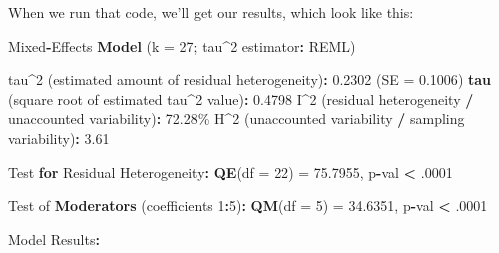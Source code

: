 \documentclass[
]{book}
\newenvironment{Shaded}{\begin{snugshade}}{\end{snugshade}}
\newcommand{\AttributeTok}[1]{\textcolor[rgb]{0.13,0.29,0.53}{#1}}
\newcommand{\ControlFlowTok}[1]{\textcolor[rgb]{0.13,0.29,0.53}{\textbf{#1}}}
\newcommand{\DecValTok}[1]{\textcolor[rgb]{0.00,0.00,0.81}{#1}}
\newcommand{\FloatTok}[1]{\textcolor[rgb]{0.00,0.00,0.81}{#1}}
\newcommand{\FunctionTok}[1]{\textcolor[rgb]{0.13,0.29,0.53}{\textbf{#1}}}
\newcommand{\NormalTok}[1]{#1}
\newcommand{\OtherTok}[1]{\textcolor[rgb]{0.56,0.35,0.01}{#1}}
\newcommand{\SpecialCharTok}[1]{\textcolor[rgb]{0.81,0.36,0.00}{\textbf{#1}}}
\begin{document}
When we run that code, we'll get our results, which look like this:

\begin{Shaded}
\begin{Highlighting}[]
\NormalTok{Mixed}\SpecialCharTok{{-}}\NormalTok{Effects }\FunctionTok{Model}\NormalTok{ (}\AttributeTok{k =} \DecValTok{27}\NormalTok{; tau}\SpecialCharTok{\^{}}\DecValTok{2}\NormalTok{ estimator}\SpecialCharTok{:}\NormalTok{ REML)}

\NormalTok{tau}\SpecialCharTok{\^{}}\DecValTok{2}\NormalTok{ (estimated amount of residual heterogeneity)}\SpecialCharTok{:}     \FloatTok{0.2302}\NormalTok{ (}\AttributeTok{SE =} \FloatTok{0.1006}\NormalTok{)}
\FunctionTok{tau}\NormalTok{ (square root of estimated tau}\SpecialCharTok{\^{}}\DecValTok{2}\NormalTok{ value)}\SpecialCharTok{:}             \FloatTok{0.4798}
\NormalTok{I}\SpecialCharTok{\^{}}\DecValTok{2}\NormalTok{ (residual heterogeneity }\SpecialCharTok{/}\NormalTok{ unaccounted variability)}\SpecialCharTok{:} \FloatTok{72.28}\NormalTok{\%}
\NormalTok{H}\SpecialCharTok{\^{}}\DecValTok{2}\NormalTok{ (unaccounted variability }\SpecialCharTok{/}\NormalTok{ sampling variability)}\SpecialCharTok{:}   \FloatTok{3.61}

\NormalTok{Test }\ControlFlowTok{for}\NormalTok{ Residual Heterogeneity}\SpecialCharTok{:}
\FunctionTok{QE}\NormalTok{(}\AttributeTok{df =} \DecValTok{22}\NormalTok{) }\OtherTok{=} \FloatTok{75.7955}\NormalTok{, p}\SpecialCharTok{{-}}\NormalTok{val }\SpecialCharTok{\textless{}}\NormalTok{ .}\DecValTok{0001}

\NormalTok{Test of }\FunctionTok{Moderators}\NormalTok{ (coefficients }\DecValTok{1}\SpecialCharTok{:}\DecValTok{5}\NormalTok{)}\SpecialCharTok{:}
\FunctionTok{QM}\NormalTok{(}\AttributeTok{df =} \DecValTok{5}\NormalTok{) }\OtherTok{=} \FloatTok{34.6351}\NormalTok{, p}\SpecialCharTok{{-}}\NormalTok{val }\SpecialCharTok{\textless{}}\NormalTok{ .}\DecValTok{0001}

\NormalTok{Model Results}\SpecialCharTok{:}


\end{Highlighting}
\end{Shaded}
\end{document}
